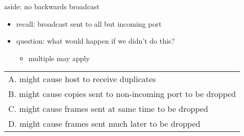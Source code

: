 \usetikzlibrary{arrows.meta,decorations.markings,patterns}

\providecommand{\computer}{%
    \texttt{[image: ../common/Noun\_project\_216.pdf]}
}
\providecommand{\switch}{%
    \texttt{[image: ../common/fig-switch.pdf]}
}
\providecommand{\router}{%
    \texttt{[image: ../common/fig-router.pdf]}
}

\begin{frame}[label=noBackwardsQ]{aside: no backwards broadcast}
    \begin{itemize}
    \item recall: broadcast sent to all but incoming port
    \item question: what would happen if we didn't do this?
        \begin{itemize}
        \item multiple may apply
        \end{itemize}
    \end{itemize}
\begin{tabular}{l}
A. might cause host to receive duplicates \\
B. might cause copies sent to non-incoming port to be dropped \\
C. might cause frames sent at same time to be dropped \\
D. might cause frames sent much later to be dropped \\
\end{tabular}
\end{frame}

